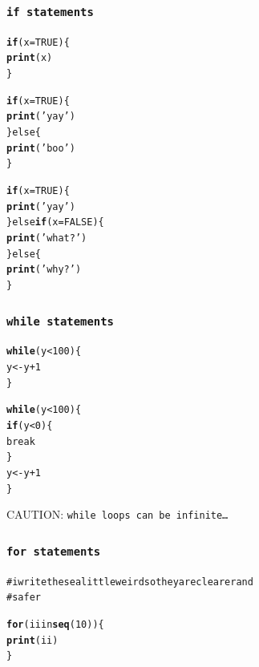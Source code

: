\documentclass{beamer}\usepackage{graphicx, color}
\makeatletter
\newcommand{\hlfunctioncall}[1]{\textcolor[rgb]{0.501960784313725,0,0.329411764705882}{\textbf{#1}}}%
\newcommand{\hlstring}[1]{\textcolor[rgb]{0.6,0.6,1}{#1}}%
\newcommand{\hlcomment}[1]{\textcolor[rgb]{0.180392156862745,0.6,0.341176470588235}{#1}}%
\newenvironment{kframe}{%
 \def\at@end@of@kframe{}%
 \ifinner\ifhmode%
  \def\at@end@of@kframe{\end{minipage}}%
  \begin{minipage}{\columnwidth}%
 \fi\fi%
 \def\FrameCommand##1{\hskip\@totalleftmargin \hskip-\fboxsep
 \colorbox{shadecolor}{##1}\hskip-\fboxsep
     \hskip-\linewidth \hskip-\@totalleftmargin \hskip\columnwidth}%
 \MakeFramed {\advance\hsize-\width
   \@totalleftmargin\z@ \linewidth\hsize
   \@setminipage}}%
 {\par\unskip\endMakeFramed%
 \at@end@of@kframe}
\newenvironment{knitrout}{}{} %
\makeatother
\begin{document}
\begin{frame}[fragile]
  \frametitle{\tt{if} statements}
\begin{knitrout}\small
{}\color{fgcolor}\begin{kframe}
\begin{alltt}
\hlfunctioncall{if}(x = TRUE) \{
  \hlfunctioncall{print}(x)
\}

\hlfunctioncall{if}(x = TRUE) \{
  \hlfunctioncall{print}(\hlstring{'yay'})
\} else \{
  \hlfunctioncall{print}(\hlstring{'boo'})
\}

\hlfunctioncall{if}(x = TRUE) \{
  \hlfunctioncall{print}(\hlstring{'yay'})
\} else \hlfunctioncall{if}(x = FALSE) \{
  \hlfunctioncall{print}(\hlstring{'what?'})
\} else \{
  \hlfunctioncall{print}(\hlstring{'why?'})
\}

\end{alltt}
\end{kframe}
\end{knitrout}


\end{frame}

\begin{frame}[fragile]
  \frametitle{\tt{while} statements}
\begin{knitrout}\small
{}\color{fgcolor}\begin{kframe}
\begin{alltt}
\hlfunctioncall{while} (y < 100) \{
    y <- y + 1
\}

\hlfunctioncall{while} (y < 100) \{
    \hlfunctioncall{if} (y < 0) \{
        break
    \}
    y <- y + 1
\}
\end{alltt}
\end{kframe}
\end{knitrout}


  CAUTION: \tt{while} loops can be infinite\dots

\end{frame}

\begin{frame}[fragile]
  \frametitle{\tt{for} statements}
\begin{knitrout}\small
{}\color{fgcolor}\begin{kframe}
\begin{alltt}
\hlcomment{# i write these a little weird so they are clearer and}
\hlcomment{# safer}

\hlfunctioncall{for} (ii in \hlfunctioncall{seq}(10)) \{
    \hlfunctioncall{print}(ii)
\}

\end{alltt}
\end{kframe}
\end{knitrout}


\end{frame}
\end{document}
